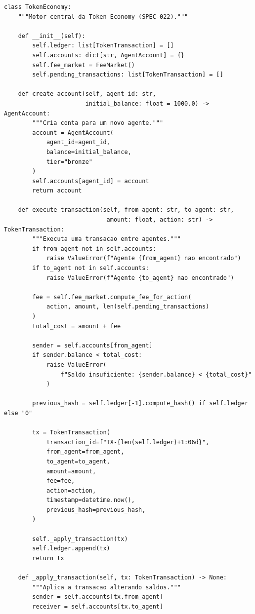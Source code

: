 \begin{lstlisting}[caption={Motor de transacoes da Token Economy},label={lst:token-engine}]
class TokenEconomy:
    """Motor central da Token Economy (SPEC-022)."""

    def __init__(self):
        self.ledger: list[TokenTransaction] = []
        self.accounts: dict[str, AgentAccount] = {}
        self.fee_market = FeeMarket()
        self.pending_transactions: list[TokenTransaction] = []

    def create_account(self, agent_id: str,
                       initial_balance: float = 1000.0) -> AgentAccount:
        """Cria conta para um novo agente."""
        account = AgentAccount(
            agent_id=agent_id,
            balance=initial_balance,
            tier="bronze"
        )
        self.accounts[agent_id] = account
        return account

    def execute_transaction(self, from_agent: str, to_agent: str,
                             amount: float, action: str) -> TokenTransaction:
        """Executa uma transacao entre agentes."""
        if from_agent not in self.accounts:
            raise ValueError(f"Agente {from_agent} nao encontrado")
        if to_agent not in self.accounts:
            raise ValueError(f"Agente {to_agent} nao encontrado")

        fee = self.fee_market.compute_fee_for_action(
            action, amount, len(self.pending_transactions)
        )
        total_cost = amount + fee

        sender = self.accounts[from_agent]
        if sender.balance < total_cost:
            raise ValueError(
                f"Saldo insuficiente: {sender.balance} < {total_cost}"
            )

        previous_hash = self.ledger[-1].compute_hash() if self.ledger else "0"

        tx = TokenTransaction(
            transaction_id=f"TX-{len(self.ledger)+1:06d}",
            from_agent=from_agent,
            to_agent=to_agent,
            amount=amount,
            fee=fee,
            action=action,
            timestamp=datetime.now(),
            previous_hash=previous_hash,
        )

        self._apply_transaction(tx)
        self.ledger.append(tx)
        return tx

    def _apply_transaction(self, tx: TokenTransaction) -> None:
        """Aplica a transacao alterando saldos."""
        sender = self.accounts[tx.from_agent]
        receiver = self.accounts[tx.to_agent]


\end{lstlisting}
